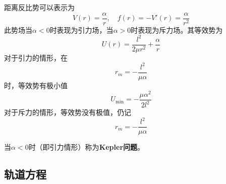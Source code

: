 距离反比势可以表示为
\begin{equation*}
	V(r) = \frac{\alpha}{r},\quad f(r) = -V'(r) = \frac{\alpha}{r^2}
\end{equation*}
此势场当$\alpha<0$时表现为引力场，当$\alpha>0$时表现为斥力场。其等效势为
\begin{equation}
	U(r) = \frac{l^2}{2\mu r^2} + \frac{\alpha}{r}
\end{equation}
对于引力的情形，在
\begin{equation}
	r_m = -\frac{l^2}{\mu \alpha}
\end{equation}
时，等效势有极小值
\begin{equation}
	U_{\mathrm{min}} = -\frac{\mu \alpha^2}{2l^2}
\end{equation}
对于斥力的情形，等效势没有极值，仍记
\begin{equation*}
	r_m = -\frac{l^2}{\mu \alpha}
\end{equation*}

当$\alpha<0$时（即引力情形）称为{\bf Kepler问题}。

\subsection{轨道方程}

